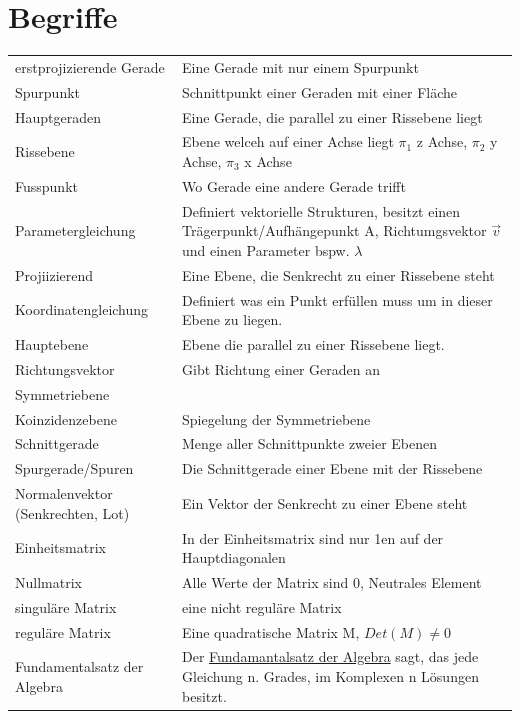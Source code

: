 \documentclass[a4paper,10pt]{report}
\begin{document}
 \section{Begriffe}
 \begin{tabularx}{\textwidth}{lX}
 erstprojizierende Gerade & Eine Gerade mit nur einem Spurpunkt\\
 Spurpunkt & Schnittpunkt einer Geraden mit einer Fläche\\
 Hauptgeraden & Eine Gerade, die parallel zu einer Rissebene liegt\\
 Rissebene & Ebene welceh auf einer Achse liegt $\pi_1$ z Achse, $\pi_2$ y Achse, $\pi_3$ x Achse\\
 Fusspunkt & Wo Gerade eine andere Gerade trifft\\
 Parametergleichung& Definiert vektorielle Strukturen, besitzt einen Trägerpunkt/Aufhängepunkt A, Richtumgsvektor $\vec{v}$ und einen Parameter bspw. $\lambda$ \\
 Projiizierend & Eine Ebene, die Senkrecht zu einer Rissebene steht\\
 Koordinatengleichung& Definiert was ein Punkt erfüllen muss um in dieser Ebene zu liegen.\\
 Hauptebene& Ebene die parallel zu einer Rissebene liegt.\\
 Richtungsvektor&Gibt Richtung einer Geraden an\\
 Symmetriebene&\\
 Koinzidenzebene& Spiegelung der Symmetriebene\\
 Schnittgerade& Menge aller Schnittpunkte zweier Ebenen\\
 Spurgerade/Spuren&Die Schnittgerade einer Ebene mit der Rissebene\\
 Normalenvektor (Senkrechten, Lot)& Ein Vektor der Senkrecht zu einer Ebene steht\\
 Einheitsmatrix&In der Einheitsmatrix sind nur 1en auf der Hauptdiagonalen\\
 Nullmatrix& Alle Werte der Matrix sind 0, Neutrales Element\\
 singuläre Matrix&eine nicht reguläre Matrix\\
 reguläre Matrix&Eine quadratische Matrix M, $Det(M) \not = 0$ \\
 Fundamentalsatz der Algebra & Der \underline{Fundamantalsatz der Algebra} sagt, das jede Gleichung n. Grades, im Komplexen n Lösungen besitzt.
\end{tabularx}

 
\end{document}
